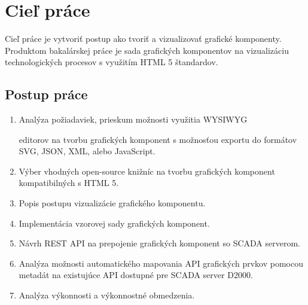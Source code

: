 \chapter{Cieľ práce}
 Cieľ práce je vytvoriť postup ako tvoriť a vizualizovať grafické komponenty. Produktom bakalárskej práce je sada grafických komponentov na vizualizáciu technologických procesov s využitím HTML 5 štandardov. 


\section*{Postup práce}
 
\begin{enumerate}
\item  Analýza požiadaviek, prieskum možnosti využitia \acs{WYSIWYG}\par editorov na tvorbu grafických komponent s možnosťou exportu do formátov \acs{SVG}, \acs{JSON}, \acs{XML}, alebo JavaScript.
\item Výber vhodných open-source knižníc na tvorbu grafických komponent kompatibilných s HTML 5.

\item Popis postupu vizualizácie grafického komponentu. 
\item  Implementácia vzorovej sady grafických komponent.
\item Návrh \acs{REST} \acs{API} na prepojenie grafických komponent so \acs{SCADA} serverom.
\item  Analýza možnosti automatického mapovania API grafických prvkov pomocou metadát na existujúce API dostupné pre SCADA server D2000.

\item  Analýza výkonnosti a výkonnostné obmedzenia.
\end{enumerate}






















